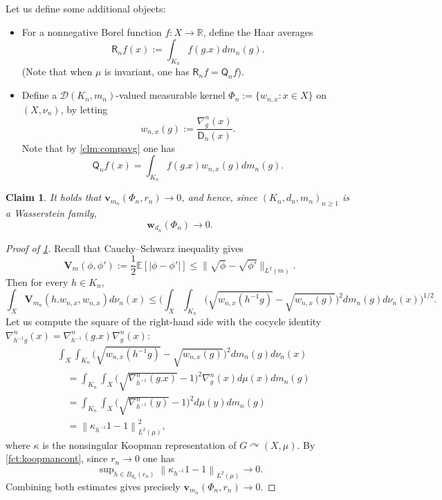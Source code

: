 \documentclass{amsart}
\numberwithin{equation}{subsection}
\theoremstyle{plain}
\theoremstyle{definition}
\theoremstyle{plain}
\newtheorem{claim}[claim]{Claim}
\begin{document}
Let us define some additional objects:
\begin{itemize}
    \item For a nonnegative Borel function \(f:X\to\mathbb{R}\), define the Haar averages
    \[\mathsf{R}_{n}f\left(x\right):=\int_{K_{n}}f\left(g.x\right)dm_{n}\left(g\right).\]
    (Note that when \(\mu\) is invariant, one has \(\mathsf{R}_{n}f=\mathsf{Q}_{n}f\)).
    \item Define a \(\mathcal{D}\left(K_{n},m_{n}\right)\)-valued measurable kernel \(\Phi_{n}:=\{w_{n,x}:x\in X\}\) on \(\left(X,\nu_{n}\right)\), by letting
    \[w_{n,x}\left(g\right):=\frac{\nabla_{g}^{n}\left(x\right)}{\mathsf{D}_{n}\left(x\right)}.\]
    Note that by \cref{clm:compavg} one has
    \[\mathsf{Q}_{n}f\left(x\right)=\int_{K_{n}}f\left(g.x\right)w_{n,x}\left(g\right)dm_{n}\left(g\right).\]
\end{itemize}

\begin{claim}\label{clm:locvar}
It holds that
\(\mathbf{v}_{m_{n}}\left(\Phi_{n},r_{n}\right)\to0\), and hence, since \(\left(K_{n},d_{n},m_{n}\right)_{n\geq 1}\) is a Wasserstein family,
\[\mathbf{w}_{d_{n}}\left(\Phi_{n}\right)\to0.\]
\end{claim}

\begin{proof}[Proof of \cref{clm:locvar}]
Recall that Cauchy--Schwarz inequality gives
\[\mathbf{V}_{m}\left(\phi,\phi'\right):=\frac{1}{2}\mathbb{E}\left[\left|\phi-\phi'\right|\right]\leq\big\|\sqrt{\phi}-\sqrt{\phi'}\big\|_{L^{2}\left(m\right)}.\]
Then for every \(h\in K_{n}\),
\[\int_{X}\mathbf{V}_{m_{n}}\left(h.w_{n,x},w_{n,x}\right)d\nu_{n}\left(x\right)\leq\Big(\int_{X}\int_{K_{n}}\Big(\sqrt{w_{n,x}\left(h^{-1}g\right)}-\sqrt{w_{n,x}\left(g\right)}\Big)^{2}dm_{n}\left(g\right)d\nu_{n}\left(x\right)\Big)^{1/2}.\]
Let us compute the square of the right-hand side with the cocycle identity \(\nabla_{h^{-1}g}^{n}\left(x\right)=\nabla_{h^{-1}}^{n}\left(g.x\right)\nabla_{g}^{n}\left(x\right)\):
\begin{align*}
&\int_{X}\int_{K_{n}}\Big(\sqrt{w_{n,x}\left(h^{-1}g\right)}-\sqrt{w_{n,x}\left(g\right)}\Big)^{2}dm_{n}\left(g\right)d\nu_{n}\left(x\right)\\
&\quad=\int_{K_{n}}\int_{X}\Big(\sqrt{\nabla_{h^{-1}}^{n}\left(g.x\right)}-1\Big)^{2}\nabla_{g}^{n}\left(x\right)d\mu\left(x\right)dm_{n}\left(g\right)\\
&\quad=\int_{K_{n}}\int_{X}\Big(\sqrt{\nabla_{h^{-1}}^{n}\left(y\right)}-1\Big)^{2}d\mu\left(y\right)dm_{n}\left(g\right)\\
&\quad=\left\|\kappa_{h^{-1}}1-1\right\|_{L^{2}\left(\mu\right)}^{2},
\end{align*}
where \(\kappa\) is the nonsingular Koopman representation of \(G\curvearrowright\left(X,\mu\right)\). By \cref{fct:koopmancont}, since \(r_{n}\to0\) one has
\[\sup\nolimits_{h\in B_{d_{n}}\left(r_{n}\right)}\left\|\kappa_{h^{-1}}1-1\right\|_{L^{2}\left(\mu\right)}\to0.\]
Combining both estimates gives precisely \(\mathbf{v}_{m_{n}}\left(\Phi_{n},r_{n}\right)\to0\).
\end{proof}
\end{document}
